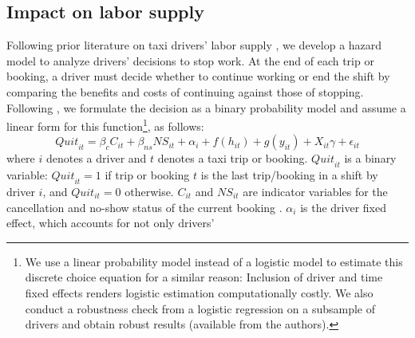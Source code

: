 \documentclass[reviewmode,AEJ]{AEA}
\begin{document}
\subsection{Impact on labor supply}
Following prior literature on taxi drivers' labor supply \citep{farber2005tomorrow,farber2015you,agarwal2015singaporean,chen2015dynamic}, we develop a hazard model 
to analyze drivers' decisions to stop work. At the end of each trip or booking, a driver must decide whether
to continue working or end the shift by comparing the benefits and costs of continuing against those of stopping. 
Following \citet{farber2005tomorrow,farber2015you}, we  
formulate the decision as a  binary probability model 
and assume a linear form for this function\footnote{We %
 use a linear probability model instead of a logistic model to estimate this discrete choice equation
 for a similar reason: Inclusion of driver and time fixed effects renders logistic estimation computationally
 costly. We also conduct a robustness check from a logistic regression on a subsample of drivers 
 and obtain robust results (available from the authors).}, as follows:
\begin{equation}
\label{eq:quit}
{Quit}_{it} = \beta_{c}C_{it} + \beta_{ns} {NS}_{it} + \alpha_i +  f(h_{it}) + g(y_{it}) + X_{it}\gamma  +  \epsilon_{it}
\end{equation}
where $i$ denotes a driver and $t$ denotes a taxi trip or booking. ${Quit}_{it}$ is a binary
variable: ${Quit}_{it} = 1$ if trip or booking $t$ is the last trip/booking in a shift by driver $i$,
and $Quit_{it} = 0$ otherwise. $C_{it}$ and ${NS}_{it}$ are indicator variables for
the cancellation and no-show status of the current booking%
. $\alpha_i$ is the driver fixed effect, which accounts for not only drivers' 
\end{document}
